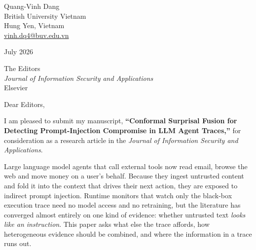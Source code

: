 \documentclass[10pt]{article}
\begin{document}
\noindent
Quang-Vinh Dang\\
British University Vietnam\\
Hung Yen, Vietnam\\
\href{mailto:vinh.dq4@buv.edu.vn}{vinh.dq4@buv.edu.vn}

\vspace{0.7em}
 July 2026

\vspace{0.7em}
\noindent
The Editors\\
\emph{Journal of Information Security and Applications}\\
Elsevier

\vspace{0.8em}
\noindent Dear Editors,

\vspace{0.6em}
I am pleased to submit my manuscript, \textbf{``Conformal Surprisal Fusion for
Detecting Prompt-Injection Compromise in LLM Agent Traces,''} for consideration as
a research article in the \emph{Journal of Information Security and
Applications}.

Large language model agents that call external tools now read email, browse the
web and move money on a user's behalf. Because they ingest untrusted content and
fold it into the context that drives their next action, they are exposed to
indirect prompt injection. Runtime monitors that watch only the black-box execution
trace need no model access and no retraining, but the literature has converged
almost entirely on one kind of evidence: whether untrusted text \emph{looks like an
instruction}. This paper asks what else the trace affords, how heterogeneous
evidence should be combined, and where the information in a trace runs out.
\end{document}
